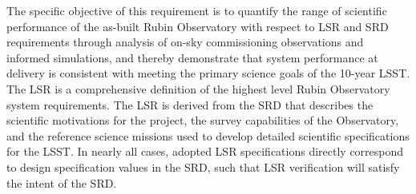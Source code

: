 The specific objective of this requirement is to quantify the range of scientific performance of the as-built Rubin Observatory with respect to LSR and SRD requirements through analysis of on-sky commissioning observations and informed simulations, and thereby demonstrate that system performance at delivery is consistent with meeting the primary science goals of the 10-year LSST.
The LSR is a comprehensive definition of the highest level Rubin Observatory system requirements.
The LSR is derived from the SRD that describes the scientific motivations for the project, the survey capabilities of the Observatory, and the reference science missions used to develop detailed scientific specifications for the LSST.
In nearly all cases, adopted LSR specifications directly correspond to design specification values in the SRD, such that LSR verification will satisfy the intent of the SRD.


